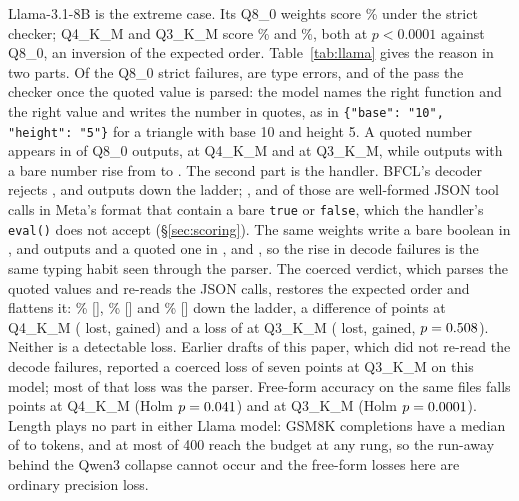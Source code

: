 \documentclass[12pt,letterpaper]{article}
\newcommand{\bfcl}{BFCL}
\begin{document}
Llama-3.1-8B is the extreme case. Its Q8\_0 weights score \qtAccLlamaEightBEight{}\% under the strict checker; Q4\_K\_M and Q3\_K\_M score \qtAccLlamaEightBFour{}\% and \qtAccLlamaEightBThree{}\%, both at $p<0.0001$ against Q8\_0, an inversion of the expected order. Table~\ref{tab:llama} gives the reason in two parts. Of the \qtFailsLlamaEightBEight{} Q8\_0 strict failures, \qtTypeErrLlamaEightBEight{} are type errors, and \qtCoercibleLlamaEightBEight{} of the \qtFailsLlamaEightBEight{} pass the checker once the quoted value is parsed: the model names the right function and the right value and writes the number in quotes, as in \texttt{\{"base": "10", "height": "5"\}} for a triangle with base 10 and height 5. A quoted number appears in \qtQuotedNumLlamaEightBEight{} of \qtNEightB{} Q8\_0 outputs, \qtQuotedNumLlamaEightBFour{} at Q4\_K\_M and \qtQuotedNumLlamaEightBThree{} at Q3\_K\_M, while outputs with a bare number rise from \qtBareNumLlamaEightBEight{} to \qtBareNumLlamaEightBThree{}. The second part is the handler. \bfcl{}'s decoder rejects \qtDecodeErrLlamaEightBEight{}, \qtDecodeErrLlamaEightBFour{} and \qtDecodeErrLlamaEightBThree{} outputs down the ladder; \qtDecodeJsonLlamaEightBEight{}, \qtDecodeJsonLlamaEightBFour{} and \qtDecodeJsonLlamaEightBThree{} of those are well-formed JSON tool calls in Meta's format that contain a bare \texttt{true} or \texttt{false}, which the handler's \texttt{eval()} does not accept (\S\ref{sec:scoring}). The same weights write a bare boolean in \qtBareBoolLlamaEightBEight{}, \qtBareBoolLlamaEightBFour{} and \qtBareBoolLlamaEightBThree{} outputs and a quoted one in \qtQuotedBoolLlamaEightBEight{}, \qtQuotedBoolLlamaEightBFour{} and \qtQuotedBoolLlamaEightBThree{}, so the rise in decode failures is the same typing habit seen through the parser. The coerced verdict, which parses the quoted values and re-reads the JSON calls, restores the expected order and flattens it: \qtCoercedAccLlamaEightBEight{}\% [\qtCoercedCiLlamaEightBEight{}], \qtCoercedAccLlamaEightBFour{}\% [\qtCoercedCiLlamaEightBFour{}] and \qtCoercedAccLlamaEightBThree{}\% [\qtCoercedCiLlamaEightBThree{}] down the ladder, a difference of \qtCoercedDeltaLlamaEightBFour{} points at Q4\_K\_M (\qtCoercedLostLlamaEightBFour{} lost, \qtCoercedGainedLlamaEightBFour{} gained) and a loss of \qtCoercedDropLlamaEightBThree{} at Q3\_K\_M (\qtCoercedLostLlamaEightBThree{} lost, \qtCoercedGainedLlamaEightBThree{} gained, $p=0.508{}$). Neither is a detectable loss. Earlier drafts of this paper, which did not re-read the decode failures, reported a coerced loss of seven points at Q3\_K\_M on this model; most of that loss was the parser. Free-form accuracy on the same files falls \qtLlamaEightBGsmDropFour{} points at Q4\_K\_M (Holm $p=0.041{}$) and \qtLlamaEightBGsmDropThree{} at Q3\_K\_M (Holm $p=0.0001{}$). Length plays no part in either Llama model: GSM8K completions have a median of \qtLlamaThreeBGsmMedTokEight{} to \qtLlamaEightBGsmMedTokEight{} tokens, and at most \qtLlamaEightBGsmTruncThree{} of 400 reach the budget at any rung, so the run-away behind the Qwen3 collapse cannot occur and the free-form losses here are ordinary precision loss.
\end{document}

